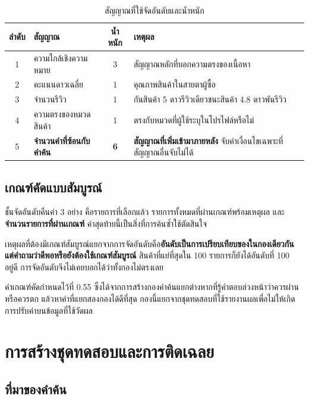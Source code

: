 \begin{table}[H]
\centering
\caption{สัญญาณที่ใช้จัดอันดับและน้ำหนัก}
\label{tab:signals}
\begin{tabular}{|c|l|c|p{6.4cm}|}
\hline
\textbf{ลำดับ} & \textbf{สัญญาณ} & \textbf{น้ำหนัก} & \textbf{เหตุผล} \\
\hline
1 & ความใกล้เชิงความหมาย & 3 & สัญญาณหลักที่บอกความตรงของเนื้อหา \\ \hline
2 & คะแนนดาวเฉลี่ย & 1 & คุณภาพสินค้าในสายตาผู้ซื้อ \\ \hline
3 & จำนวนรีวิว & 1 & กันสินค้า 5 ดาวรีวิวเดียวชนะสินค้า 4.8 ดาวพันรีวิว \\ \hline
4 & ความตรงของหมวดสินค้า & 1 & ตรงกับหมวดที่ผู้ใช้ระบุในโปรไฟล์หรือไม่ \\ \hline
5 & \textbf{จำนวนคำที่ซ้อนกับคำค้น} & \textbf{6} & \textbf{สัญญาณที่เพิ่มเข้ามาภายหลัง} จับคำเงื่อนไขเฉพาะที่สัญญาณอื่นจับไม่ได้ \\
\hline
\end{tabular}
\end{table}

\subsection{เกณฑ์คัดแบบสัมบูรณ์}

ชั้นจัดอันดับคืนค่า 3 อย่าง คือรายการที่เลือกแล้ว รายการทั้งหมดที่ผ่านเกณฑ์พร้อมเหตุผล และ\textbf{จำนวนรายการที่ผ่านเกณฑ์} ค่าสุดท้ายนี้เป็นสิ่งที่การค้นซ้ำใช้ตัดสินใจ

เหตุผลที่ต้องมีเกณฑ์สัมบูรณ์แยกจากการจัดอันดับคือ\textbf{อันดับเป็นการเปรียบเทียบของในกองเดียวกัน แต่คำถามว่าดีพอหรือยังต้องใช้เกณฑ์สัมบูรณ์} สินค้าที่แย่ที่สุดใน 100 รายการก็ยังได้อันดับที่ 100 อยู่ดี การจัดอันดับจึงไม่เคยบอกได้ว่าทั้งกองไม่ตรงเลย

ค่าเกณฑ์คัดกำหนดไว้ที่ 0.55 ซึ่งได้จากการสร้างกองคำค้นแยกต่างหากที่รู้คำตอบล่วงหน้าว่าควรผ่านหรือควรตก แล้วหาค่าที่แยกสองกองได้ดีที่สุด กองนี้แยกจากชุดทดสอบที่ใช้รายงานผลเพื่อไม่ให้เกิดการปรับค่าบนข้อมูลที่ใช้วัดผล

\section{การสร้างชุดทดสอบและการติดเฉลย}

\subsection{ที่มาของคำค้น}

